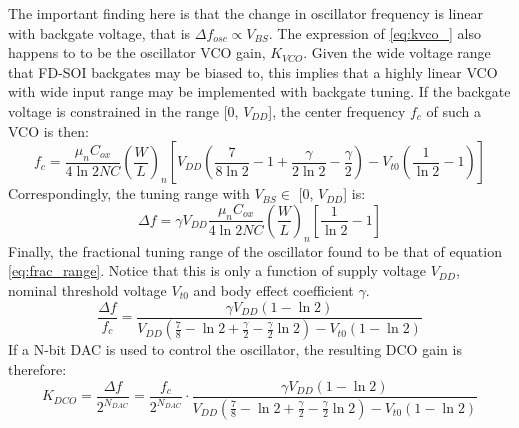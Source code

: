 		The important finding here is that the change in oscillator frequency is linear with backgate voltage, that is $\Delta f_{osc} \propto V_{BS}$. The expression of \ref{eq:kvco_} also happens to to be the oscillator VCO gain, $K_{VCO}$. Given the wide voltage range that FD-SOI backgates may be biased to, this implies that a highly linear VCO with wide input range may be implemented with backgate tuning. If the backgate voltage is constrained in the range [0, $V_{DD}$], the center frequency $f_c$ of such a VCO is then:
		\begin{equation}
			f_{c} = \frac{\mu_nC_{ox}}{4\ln2NC}\left(\frac{W}{L}\right)_n\left[V_{DD}\left(\frac{7}{8\ln2}-1+\frac{\gamma}{2\ln2}-\frac{\gamma}{2}\right)-V_{t0}\left(\frac{1}{\ln2}-1\right)\right]
		\end{equation}
		Correspondingly, the tuning range with $V_{BS} \in$ [0, $V_{DD}$] is:
		\begin{equation}\label{eq:tuning_range}
			\Delta f = \gamma V_{DD}\frac{\mu_nC_{ox}}{4\ln2NC}\left(\frac{W}{L}\right)_n\left[\frac{1}{\ln2}-1\right]
		\end{equation}
		Finally, the fractional tuning range of the oscillator found to be that of equation \ref{eq:frac_range}. Notice that this is only a function of supply voltage $V_{DD}$, nominal threshold voltage $V_{t0}$ and body effect coefficient $\gamma$.
		\begin{equation}\label{eq:frac_range}
			\frac{\Delta f}{f_c} = \frac{\gamma V_{DD}\left( 1-\ln2 \right)}{V_{DD}\left(\frac{7}{8}-\ln2+\frac{\gamma}{2}-\frac{\gamma}{2}\ln2\right)-V_{t0}\left(1-\ln2\right)}
		\end{equation}	
		If a N-bit DAC is used to control the oscillator, the resulting DCO gain is therefore:
		\begin{equation}
			K_{DCO} = \frac{\Delta f}{2^{N_{DAC}}} = \frac{f_c}{2^{N_{DAC}}}\cdot\frac{\gamma V_{DD}\left( 1-\ln2 \right)}{V_{DD}\left(\frac{7}{8}-\ln2+\frac{\gamma}{2}-\frac{\gamma}{2}\ln2\right)-V_{t0}\left(1-\ln2\right)}
		\end{equation}	


